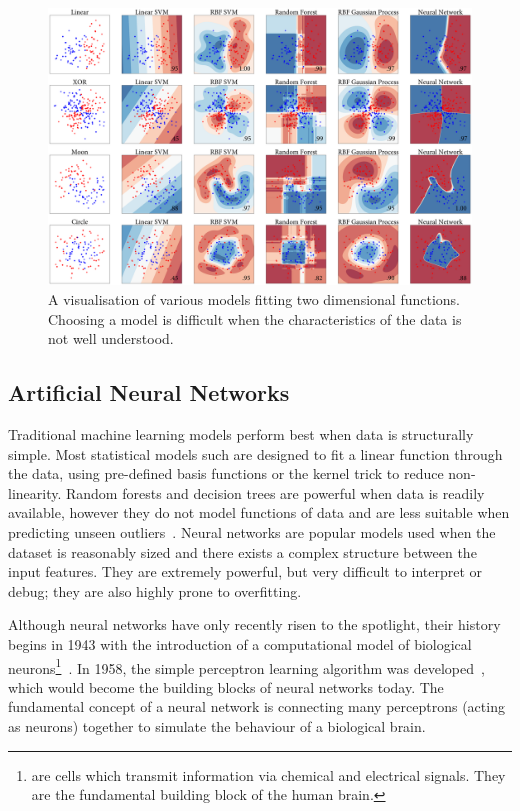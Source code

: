 \documentclass[12pt, twoside]{book}
\renewcommand\emph[1]{\textit{\color{USred}{#1}}}
\begin{document}
\begin{figure}[h]
	\centerline{\centering\includegraphics[width=1.2\linewidth]{model_vis.png}}
	\caption{A visualisation of various models fitting two dimensional functions. Choosing a model is difficult when the characteristics of the data is not well understood.}
	\label{modelvis}
\end{figure}

\subsection{Artificial Neural Networks}

 
Traditional machine learning models perform best when data is structurally simple. Most statistical models such are designed to fit a linear function through the data, using pre-defined basis functions or the kernel trick to reduce non-linearity. Random forests and decision trees are powerful when data is readily available, however they do not model functions of data and are less suitable when predicting unseen outliers~\cite{kramer2001propositionalization}. Neural networks are popular models used when the dataset is reasonably sized and there exists a complex structure between the input features. They are extremely powerful, but very difficult to interpret or debug; they are also highly prone to overfitting.
 
\label{neuralnetworkintro}Although neural networks have only recently risen to the spotlight, their history begins in 1943 with the introduction of a computational model of biological neurons\footnote{\emph{Neurons} are cells which transmit information via chemical and electrical signals. They are the fundamental building block of the human brain.}~\cite{nn1943}.
In 1958, the simple perceptron learning algorithm was developed~\cite{rosenblatt1958perceptron}, which would become the building blocks of neural networks today. The fundamental concept of a neural network is connecting many perceptrons (acting as neurons) together to simulate the behaviour of a biological brain. 
\end{document}

